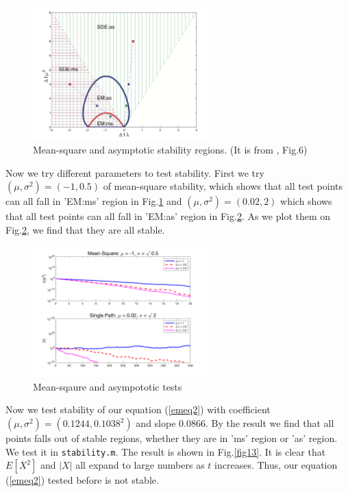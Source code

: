 \documentclass[12pt,a4paper]{article}
\theoremstyle{definition}
\begin{document}
\begin{figure}[htbp]
\centering
\includegraphics[width=0.6\textwidth]{fig/fig11.png}
\caption{\label{fig11} Mean-square and asymptotic stability regions. (It is from \cite{higham._2001}, Fig.6) }
\end{figure}


Now we try different parameters to test stability. First we try $(\mu,\sigma^2)=(-1,0.5)$ of mean-square stability, which shows that all test points can all fall in 'EM:ms' region in Fig.\ref{fig11} and  $(\mu,\sigma^2)=(0.02,2)$ which shows that all test points can all fall in 'EM:as' region in Fig.\ref{fig12}. As we plot them on Fig.\ref{fig12}, we find that they are all stable.

\begin{figure}[htbp]
\centering
\includegraphics[width=0.6\textwidth]{fig/fig12.png}
\caption{\label{fig12} Mean-sqaure and asympototic tests }
\end{figure}

Now we test stability of our equation (\ref{emeq2}) with coefficient $(\mu,\sigma^2)=(0.1244,0.1038^2)$ and slope $0.0866$. By the result we find that all points falls out of stable regions, whether they are in 'ms' region or 'as' region. We test it in \verb|stability.m|. The result is shown in Fig.\ref{fig13}. It is clear that $E[X^2]$ and $|X|$ all expand to large numbers as $t$ increases. Thus, our equation (\ref{emeq2}) tested before is not stable.
\end{document}
